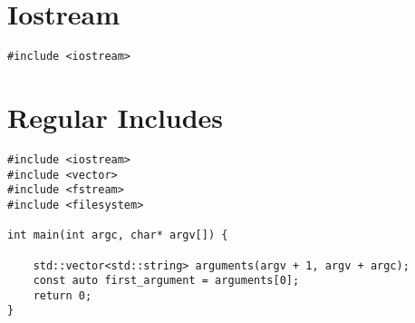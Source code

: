 
\section{Iostream}

\begin{verbatim}
#include <iostream>
\end{verbatim}

\section{Regular Includes}

\begin{verbatim}
#include <iostream>
#include <vector>
#include <fstream>
#include <filesystem>

int main(int argc, char* argv[]) {

    std::vector<std::string> arguments(argv + 1, argv + argc);
    const auto first_argument = arguments[0];
    return 0;
}
\end{verbatim}
